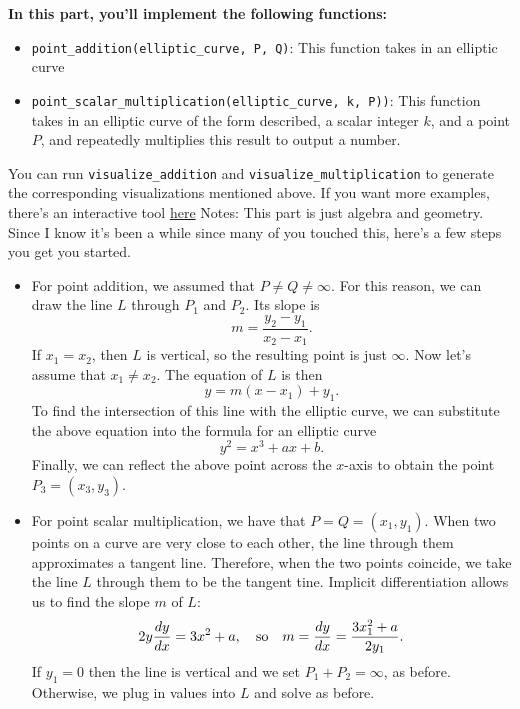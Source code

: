 \documentclass{article}
\begin{document}
\begin{tcolorbox}[enhanced,interior style={top color=Plum!20,bottom color=Plum!30}]
    \textbf{In this part, you'll implement the following functions:}
    \begin{itemize}
        \item \lstinline{point_addition(elliptic_curve, P, Q)}: This function takes in an elliptic curve 
        \item \lstinline{point_scalar_multiplication(elliptic_curve, k, P))}: This function takes in an elliptic curve of the form described, a scalar integer $k$, and a point $P$, and repeatedly multiplies this result to output a number.
    \end{itemize}
    You can run \lstinline{visualize_addition} and \lstinline{visualize_multiplication} to generate the corresponding visualizations mentioned above. If you want more examples, there's an interactive tool \href{https://andrea.corbellini.name/ecc/interactive/reals-add.html}{here}
    Notes: This part is just algebra and geometry. Since I know it's been a while since many of you touched this, here's a few steps you get you started.
    \begin{itemize}
        \item For point addition, we assumed that $P \ne Q \ne \infty$. For this reason, we can draw the line $L$ through $P_{1}$ and $P_{2}$. Its slope is $$m = \frac{y_{2} - y_{1}}{x_{2} - x_{1}}.$$ If $x_{1} = x_{2}$, then $L$ is vertical, so the resulting point is just $\infty$. Now let's assume that $x_{1} \ne x_{2}$. The equation of $L$ is then $$y = m(x - x_{1}) + y_{1}.$$ To find the intersection of this line with the elliptic curve, we can substitute the above equation into the formula for an elliptic curve $$y^{2} = x^{3} + ax + b.$$ Finally, we can reflect the above point across the $x$-axis to obtain the point $P_{3} = (x_{3}, y_{3})$.
        \item For point scalar multiplication, we have that $P = Q = (x_{1}, y_{1})$. When two points on a curve are very close to each other, the line through them approximates a tangent line. Therefore, when the two points coincide, we take the line $L$ through them to be the tangent tine. Implicit differentiation allows us to find the slope $m$ of $L$: $$2y \frac{dy}{dx} = 3x^{2} + a,\text{\quad so\quad} m = \frac{dy}{dx} = \frac{3x_{1}^{2} + a}{2y_{1}}.$$ If $y_{1} = 0$ then the line is vertical and we set $P_{1} + P_{2} = \infty$, as before. Otherwise, we plug in values into $L$ and solve as before.
    \end{itemize}
    
\end{tcolorbox}
\end{document}
